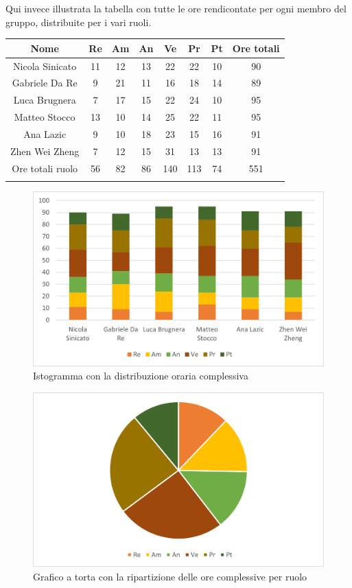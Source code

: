 Qui invece illustrata la tabella con tutte le ore rendicontate per ogni membro del gruppo, distribuite per i vari ruoli.
\setlength\extrarowheight{5pt}
\begin{tabularx}{\textwidth}{|ccccccc|c|}
	\hline
	\rowcolor{white}
	\textbf{Nome} & \textbf{Re} & \textbf{Am} & \textbf{An} & \textbf{Ve} & \textbf{Pr}& \textbf{Pt} & \textbf{Ore totali} \\
	\hline
	Nicola Sinicato &11&12&13&22&22&10&90 \\
	Gabriele Da Re &9&21&11&16&18&14&89 \\
	Luca Brugnera &7&17&15&22&24&10&95 \\
	Matteo Stocco &13&10&14&25&22&11&95 \\
	Ana Lazic &9&10&18&23&15&16&91 \\
	Zhen Wei Zheng &7&12&15&31&13&13&91 \\
	\hline
	Ore totali ruolo &56&82&86&140&113&74&551 \\
	\hline
	\rowcolor{white}
	\caption{Ripartizione complessiva delle ore per ruolo e persona}
\end{tabularx}

\begin{figure}[H]
	\centering
	\includegraphics[scale=0.8]{img/consuntivo_membri.png}
	\caption{Istogramma con la distribuzione oraria complessiva}
\end{figure}
\begin{figure}[H]
	\centering
	\includegraphics[scale=0.8]{img/consuntivo_ruoli.png}
	\caption{Grafico a torta con la ripartizione delle ore complessive per ruolo}
\end{figure}
